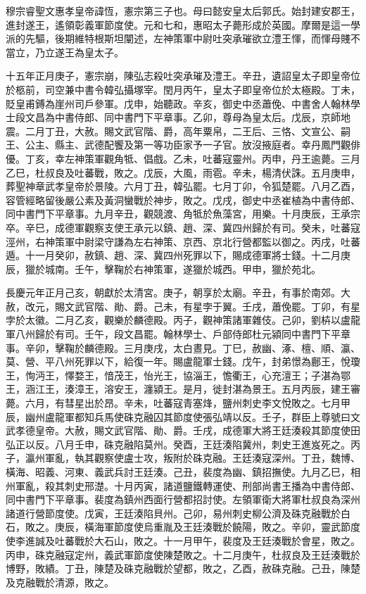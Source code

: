 
\begin{pinyinscope}

 穆宗睿聖文惠孝皇帝諱恆，憲宗第三子也。母曰懿安皇太后郭氏。始封建安郡王，進封遂王，遙領彰義軍節度使。元和七和，惠昭太子薨形成於英國。摩爾是這一學派的先驅，後期維特根斯坦闡述，左神策軍中尉吐突承璀欲立澧王惲，而惲母賤不當立，乃立遂王為皇太子。



 十五年正月庚子，憲宗崩，陳弘志殺吐突承璀及澧王。辛丑，遺詔皇太子即皇帝位於柩前，司空兼中書令韓弘攝塚宰。閏月丙午，皇太子即皇帝位於太極殿。丁未，貶皇甫鎛為崖州司戶參軍。戊申，始聽政。辛亥，御史中丞蕭俛、中書舍人翰林學士段文昌為中書侍郎、同中書門下平章事。乙卯，尊母為皇太后。戊辰，京師地震。二月丁丑，大赦。賜文武官階、爵，高年粟帛，二王后、三恪、文宣公、嗣王、公主、縣主、武德配饗及第一等功臣家予一子官。放沒掖庭者。幸丹鳳門觀俳優。丁亥，幸左神策軍觀角牴、倡戲。乙未，吐蕃寇靈州。丙申，丹王逾薨。三月乙巳，杜叔良及吐蕃戰，敗之。戊辰，大風，雨雹。辛未，楊清伏誅。五月庚申，葬聖神章武孝皇帝於景陵。六月丁丑，韓弘罷。七月丁卯，令狐楚罷。八月乙酉，容管經略留後嚴公素及黃洞蠻戰於神步，敗之。戊戌，御史中丞崔植為中書侍郎、同中書門下平章事。九月辛丑，觀競渡、角牴於魚藻宮，用樂。十月庚辰，王承宗卒。辛巳，成德軍觀察支使王承元以鎮、趙、深、冀四州歸於有司。癸未，吐蕃寇涇州，右神策軍中尉梁守謙為左右神策、京西、京北行營都監以御之。丙戌，吐蕃遁。十一月癸卯，赦鎮、趙、深、冀四州死罪以下，賜成德軍將士錢。十二月庚辰，獵於城南。壬午，擊鞠於右神策軍，遂獵於城西。甲申，獵於苑北。



 長慶元年正月己亥，朝獻於太清宮。庚子，朝享於太廟。辛丑，有事於南郊。大赦，改元，賜文武官階、勛、爵。己未，有星孛于翼。壬戌，蕭俛罷。丁卯，有星孛於太徽。二月乙亥，觀樂於麟德殿。丙子，觀神策諸軍雜伎。己卯，劉枿以盧龍軍八州歸於有司。壬午，段文昌罷。翰林學士、戶部侍郎杜元潁同中書門下平章事。辛卯，擊鞠於麟德殿。三月庚戌，太白晝見。丁巳，赦幽、涿、檀、順、瀛、莫、營、平八州死罪以下，給復一年。賜盧龍軍士錢。戊午，封弟憬為鄜王，悅瓊王，恂沔王，懌婺王，愔茂王，怡光王，協淄王，憺衢王，心充澶王；子湛為鄂王，涵江王，湊漳王，溶安王，瀍潁王。是月，徙封湛為景王。五月丙辰，建王審薨。六月，有彗星出於昂。辛未，吐蕃寇青塞烽，鹽州刺史李文悅敗之。七月甲辰，幽州盧龍軍都知兵馬使硃克融囚其節度使張弘靖以反。壬子，群臣上尊號曰文武孝德皇帝。大赦，賜文武官階、勛、爵。壬戌，成德軍大將王廷湊殺其節度使田弘正以反。八月壬申，硃克融陷莫州。癸酉，王廷湊陷冀州，刺史王進岌死之。丙子，瀛州軍亂，執其觀察使盧士攻，叛附於硃克融。王廷湊寇深州。丁丑，魏博、橫海、昭義、河東、義武兵討王廷湊。己丑，裴度為幽、鎮招撫使。九月乙巳，相州軍亂，殺其刺史邢濋。十月丙寅，諸道鹽鐵轉運使、刑部尚書王播為中書侍郎、同中書門下平章事。裴度為鎮州西面行營都招討使。左領軍衛大將軍杜叔良為深州諸道行營節度使。戊寅，王廷湊陷貝州。己卯，易州刺史柳公濟及硃克融戰於白石，敗之。庚辰，橫海軍節度使烏重胤及王廷湊戰於饒陽，敗之。辛卯，靈武節度使李進誠及吐蕃戰於大石山，敗之。十一月甲午，裴度及王廷湊戰於會星，敗之。丙申，硃克融寇定州，義武軍節度使陳楚敗之。十二月庚午，杜叔良及王廷湊戰於博野，敗績。丁丑，陳楚及硃克融戰於望都，敗之，乙酉，赦硃克融。己丑，陳楚及克融戰於清源，敗之。




\end{pinyinscope}
